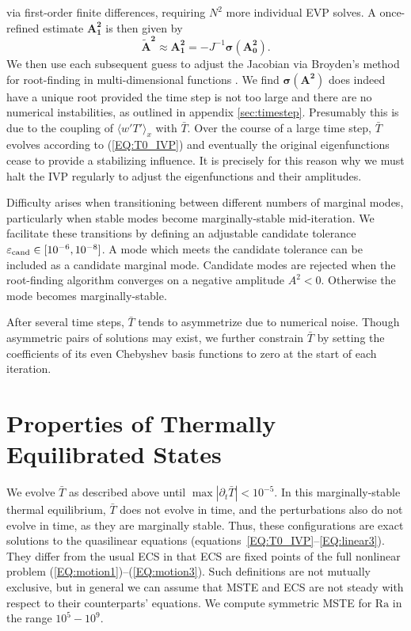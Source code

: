 \documentclass[reprint,amsmath,amssymb,aps]{revtex4-1}
\newcommand\Ra{\mathrm{Ra}}
\renewcommand{\vec}[1]{\boldsymbol{#1}}
\newcommand{\eq}[1]{(\ref{#1})}
\newcommand{\eqss}[2]{(\ref{#1})--(\ref{#2})}
\begin{document}
via first-order finite differences, requiring $N^2$ more individual EVP solves.
A once-refined estimate $\vec{A^2_1}$ is then given by
\begin{equation}
    \vec{\tilde{A}^2} \approx \vec{A^2_1} = -J^{-1} \vec{\sigma}(\vec{A^2_0}).
\end{equation}
We then use each subsequent guess to adjust the Jacobian via Broyden's method for root-finding in multi-dimensional functions \cite{Broyden}.
We find $\vec{\sigma}(\vec{A^2})$ does indeed have a unique root provided the time step is not too large and there are no numerical instabilities, as outlined in appendix \ref{sec:timestep}.
Presumably this is due to the coupling of $\langle w'T' \rangle_x$ with $\bar{T}$.
Over the course of a large time step, $\bar{T}$ evolves according to \eq{EQ:T0_IVP} and eventually the original eigenfunctions cease to provide a stabilizing influence.
It is precisely for this reason why we must halt the IVP regularly to adjust the eigenfunctions and their amplitudes.

Difficulty arises when transitioning between different numbers of marginal modes, particularly when stable modes become marginally-stable mid-iteration.
We facilitate these transitions by defining an adjustable candidate tolerance $\varepsilon_{\rm{cand}} \in [10^{-6}, 10^{-8}]$.
A mode which meets the candidate tolerance can be included as a candidate marginal mode.
Candidate modes are rejected when the root-finding algorithm converges on a negative amplitude $A^2 < 0$.
Otherwise the mode becomes marginally-stable.

After several time steps, $\bar{T}$ tends to asymmetrize due to numerical noise. 
Though asymmetric pairs of solutions may exist, we further constrain $\bar{T}$ by setting the coefficients of its even Chebyshev basis functions to zero at the start of each iteration.

\section{Properties of Thermally Equilibrated States}\label{sec:properties}
We evolve $\bar{T}$ as described above until $\max|\partial_{t}\bar{T}| < 10^{-5}$.
In this marginally-stable thermal equilibrium, $\bar{T}$ does not evolve in time, and the perturbations also do not evolve in time, as they are marginally stable.
Thus, these configurations are exact solutions to the quasilinear equations (equations~\ref{EQ:T0_IVP}--\ref{EQ:linear3}).
They differ from the usual ECS in that ECS are fixed points of the full nonlinear problem \eqss{EQ:motion1}{EQ:motion3}. 
Such definitions are not mutually exclusive, but in general we can assume that MSTE and ECS are not steady with respect to their counterparts' equations.
We compute symmetric MSTE for $\Ra$ in the range $10^5 - 10^9$.
\end{document}
